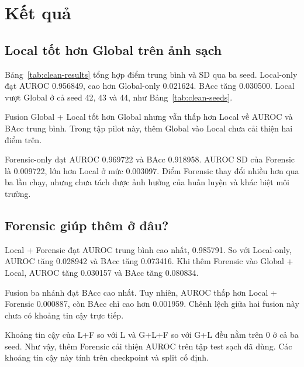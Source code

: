 \section{Kết quả}
\subsection{Local tốt hơn Global trên ảnh sạch}
Bảng~\ref{tab:clean-results} tổng hợp điểm trung bình và SD qua ba seed. Local-only đạt AUROC 0.956849, cao hơn Global-only 0.021624. BAcc tăng 0.030500. Local vượt Global ở cả seed 42, 43 và 44, như Bảng~\ref{tab:clean-seeds}.

Fusion Global + Local tốt hơn Global nhưng vẫn thấp hơn Local về AUROC và BAcc trung bình. Trong tập pilot này, thêm Global vào Local chưa cải thiện hai điểm trên.

Forensic-only đạt AUROC 0.969722 và BAcc 0.918958. AUROC SD của Forensic là 0.009722, lớn hơn Local ở mức 0.003097. Điểm Forensic thay đổi nhiều hơn qua ba lần chạy, nhưng chưa tách được ảnh hưởng của huấn luyện và khác biệt môi trường.

\begin{table}[H]
\centering
\caption{Điểm macro trên ảnh sạch qua ba seed. AUROC và BAcc là trung bình, SD là sample standard deviation.}
\label{tab:clean-results}

\end{table}

\subsection{Forensic giúp thêm ở đâu?}
Local + Forensic đạt AUROC trung bình cao nhất, 0.985791. So với Local-only, AUROC tăng 0.028942 và BAcc tăng 0.073416. Khi thêm Forensic vào Global + Local, AUROC tăng 0.030157 và BAcc tăng 0.080834.

Fusion ba nhánh đạt BAcc cao nhất. Tuy nhiên, AUROC thấp hơn Local + Forensic 0.000887, còn BAcc chỉ cao hơn 0.001959. Chênh lệch giữa hai fusion này chưa có khoảng tin cậy trực tiếp.

\begin{table}[H]
\centering
\caption{Chênh lệch AUROC trên ảnh sạch và khoảng tin cậy bootstrap 95\%.}
\label{tab:paired-ci}

\end{table}

Khoảng tin cậy của L+F so với L và G+L+F so với G+L đều nằm trên 0 ở cả ba seed. Như vậy, thêm Forensic cải thiện AUROC trên tập test sạch đã dùng. Các khoảng tin cậy này tính trên checkpoint và split cố định.


